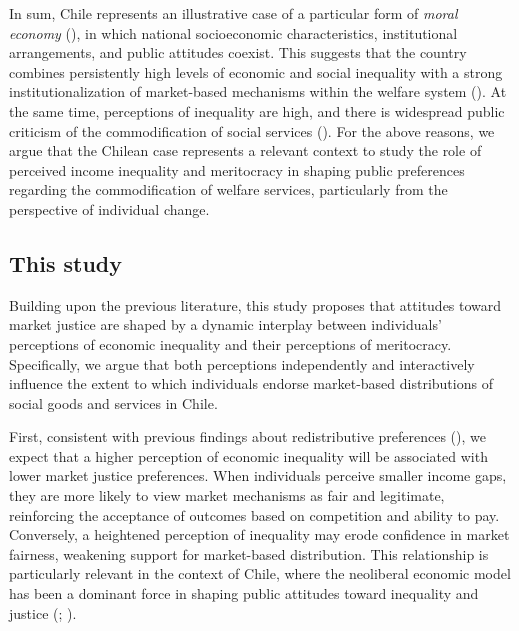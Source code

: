 \documentclass[
  12pt,
]{article}
\begin{document}
In sum, Chile represents an illustrative case of a particular form of
\emph{moral economy} (), in which national socioeconomic characteristics, institutional
arrangements, and public attitudes coexist. This suggests that the
country combines persistently high levels of economic and social
inequality with a strong institutionalization of market-based mechanisms
within the welfare system
(). At the same
time, perceptions of inequality are high, and there is widespread public
criticism of the commodification of social services
(). For the above
reasons, we argue that the Chilean case represents a relevant context to
study the role of perceived income inequality and meritocracy in shaping
public preferences regarding the commodification of welfare services,
particularly from the perspective of individual change.

\subsection{This study}\label{this-study}

Building upon the previous literature, this study proposes that
attitudes toward market justice are shaped by a dynamic interplay
between individuals' perceptions of economic inequality and their
perceptions of meritocracy. Specifically, we argue that both perceptions
independently and interactively influence the extent to which
individuals endorse market-based distributions of social goods and
services in Chile.

First, consistent with previous findings about redistributive
preferences (), we expect that a higher perception of economic inequality will
be associated with lower market justice preferences. When individuals
perceive smaller income gaps, they are more likely to view market
mechanisms as fair and legitimate, reinforcing the acceptance of
outcomes based on competition and ability to pay. Conversely, a
heightened perception of inequality may erode confidence in market
fairness, weakening support for market-based distribution. This
relationship is particularly relevant in the context of Chile, where the
neoliberal economic model has been a dominant force in shaping public
attitudes toward inequality and justice
(;
).
\end{document}
